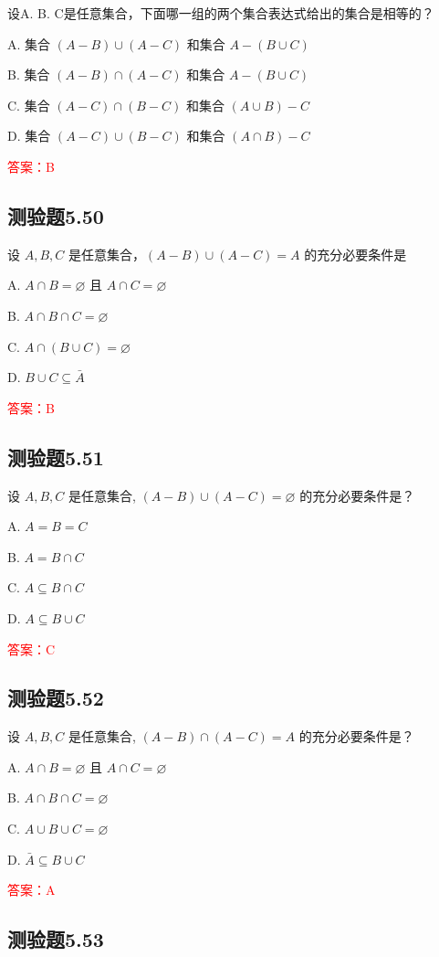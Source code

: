 \documentclass[UTF8, heading=true]{ctexart}
\begin{document}
设A. B. C是任意集合，下面哪一组的两个集合表达式给出的集合是相等的？

A. 集合 $(A-B) \cup(A-C)$ 和集合 $A-(B \cup C)$

B. 集合 $(A-B) \cap(A-C)$ 和集合 $A-(B \cup C)$

C. 集合 $(A-C) \cap(B-C)$ 和集合 $(A \cup B)-C$

D. 集合 $(A-C) \cup(B-C)$ 和集合 $(A \cap B)-C$

\textcolor{red}{答案：B}

\subsection{测验题5.50}

设 $A, B, C$ 是任意集合，$(A-B) \cup(A-C)=A$ 的充分必要条件是

A. $A \cap B=\varnothing$ 且 $A \cap C=\varnothing$

B. $A \cap B \cap C=\varnothing$

C. $A \cap(B \cup C)=\varnothing$

D. $B \cup C \subseteq \bar{A}$

\textcolor{red}{答案：B}

\subsection{测验题5.51}

设 $A, B, C$ 是任意集合, $(A-B) \cup(A-C)=\varnothing$ 的充分必要条件是？

A. $A=B=C$

B. $A=B \cap C$

C. $A \subseteq B \cap C$

D. $A \subseteq B \cup C$

\textcolor{red}{答案：C}

\subsection{测验题5.52}

设 $A, B, C$ 是任意集合, $(A-B) \cap(A-C)=A$ 的充分必要条件是？

A. $A \cap B=\varnothing$ 且 $A \cap C=\varnothing$

B. $A \cap B \cap C=\varnothing$

C. $A \cup B \cup C=\varnothing$

D. $\bar{A} \subseteq B \cup C$

\textcolor{red}{答案：A}

\subsection{测验题5.53}
\end{document}
